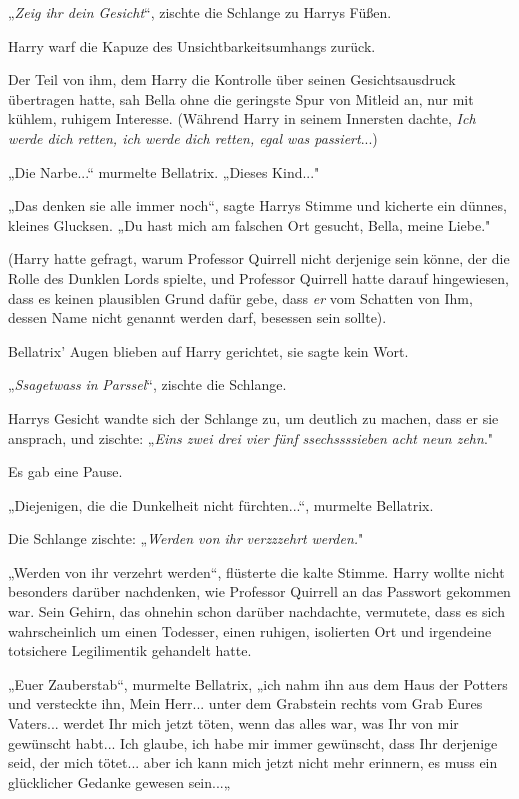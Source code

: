 {„\emph{Zeig ihr dein Gesicht}“, zischte die Schlange zu Harrys Füßen.

Harry warf die Kapuze des Unsichtbarkeitsumhangs zurück.

Der Teil von ihm, dem Harry die Kontrolle über seinen Gesichtsausdruck übertragen hatte, sah Bella ohne die geringste Spur von Mitleid an, nur mit kühlem, ruhigem Interesse. (Während Harry in seinem Innersten dachte, \emph{Ich werde dich retten, ich werde dich retten, egal was passiert}...)

„Die Narbe...“ murmelte Bellatrix. „Dieses Kind..."

„Das denken sie alle immer noch“, sagte Harrys Stimme und kicherte ein dünnes, kleines Glucksen. „Du hast mich am falschen Ort gesucht, Bella, meine Liebe."

(Harry hatte gefragt, warum Professor Quirrell nicht derjenige sein könne, der die Rolle des Dunklen Lords spielte, und Professor Quirrell hatte darauf hingewiesen, dass es keinen plausiblen Grund dafür gebe, dass \emph{er} vom Schatten von Ihm, dessen Name nicht genannt werden darf, besessen sein sollte).

Bellatrix' Augen blieben auf Harry gerichtet, sie sagte kein Wort.

„\emph{Ssagetwass} \emph{in} \emph{Parssel}“, zischte die Schlange.

Harrys Gesicht wandte sich der Schlange zu, um deutlich zu machen, dass er sie ansprach, und zischte: „\emph{Eins zwei drei vier fünf} \emph{ssechssssieben} \emph{acht neun zehn}."

Es gab eine Pause.

„Diejenigen, die die Dunkelheit nicht fürchten...“, murmelte Bellatrix.

Die Schlange zischte: „\emph{Werden von ihr} \emph{verzzzehrt} \emph{werden.}"

„Werden von ihr verzehrt werden“, flüsterte die kalte Stimme. Harry wollte nicht besonders darüber nachdenken, wie Professor Quirrell an das Passwort gekommen war. Sein Gehirn, das ohnehin schon darüber nachdachte, vermutete, dass es sich wahrscheinlich um einen Todesser, einen ruhigen, isolierten Ort und irgendeine totsichere Legilimentik gehandelt hatte.

„Euer Zauberstab“, murmelte Bellatrix, „ich nahm ihn aus dem Haus der Potters und versteckte ihn, Mein Herr... unter dem Grabstein rechts vom Grab Eures Vaters... werdet Ihr mich jetzt töten, wenn das alles war, was Ihr von mir gewünscht habt... Ich glaube, ich habe mir immer gewünscht, dass Ihr derjenige seid, der mich tötet... aber ich kann mich jetzt nicht mehr erinnern, es muss ein glücklicher Gedanke gewesen sein...„

}
